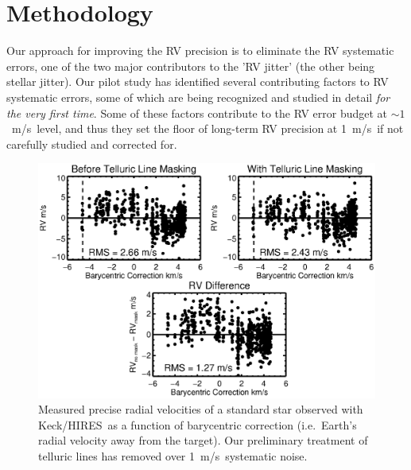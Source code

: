 \documentclass[12pt]{article}
\def\mps{m/s}
\def\keck{Keck/HIRES}
\begin{document}



\vspace{-3pt}
\section{Methodology}

Our approach for improving the RV precision is to eliminate the RV
systematic errors, one of the two major contributors to the 'RV
jitter' (the other being stellar jitter). Our pilot study has
identified several contributing factors to RV systematic errors, some
of which are being recognized and studied in detail \textit{for the
  very first time}. Some of these factors contribute to the RV error
budget at $\sim 1$~\mps\ level, and thus they set the floor of
long-term RV precision at 1~\mps\ if not carefully studied and
corrected for.

\begin{figure}[thb]
  \vspace{-5pt}
  \begin{center}
    \includegraphics[scale=0.7]{telluric}
  \end{center}
  \vspace{-25pt}  
  \caption{Measured precise radial velocities of a standard star
    observed with \keck\ as a function of barycentric correction
    (i.e.~Earth's radial velocity away from the target). Our
    preliminary treatment of telluric lines has removed over
    1~\mps\ systematic noise.}
  \vspace{-8pt}  
  \label{fig:tell}
\end{figure}
\end{document}
